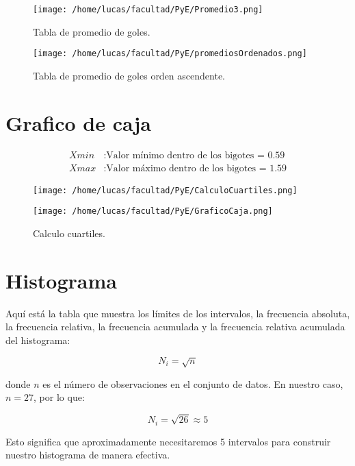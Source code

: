 \begin{figure}[h]
  \begin{center}
    \texttt{[image: /home/lucas/facultad/PyE/Promedio3.png]}
   \caption{Tabla de promedio de goles.}
  \end{center}
\end{figure}

\begin{figure}[h]
  \begin{center}
    \texttt{[image: /home/lucas/facultad/PyE/promediosOrdenados.png]}
   \caption{Tabla de promedio de goles orden ascendente.}
  \end{center}
\end{figure}

\clearpage
\section{Grafico de caja}
\begin{align*}
\text{$Xmin$} &: \text{Valor mínimo dentro de los bigotes = 0.59} \\
\text{$Xmax$} &: \text{Valor máximo dentro de los bigotes = 1.59}
\end{align*}

\begin{figure}[h]
    \centering
    \texttt{[image: /home/lucas/facultad/PyE/CalculoCuartiles.png]}
    \caption{Calculo cuartiles.}
    \texttt{[image: /home/lucas/facultad/PyE/GraficoCaja.png]}

\end{figure}

\section{Histograma}

Aquí está la tabla que muestra los límites de los intervalos, la frecuencia absoluta, la frecuencia relativa, la frecuencia acumulada y la frecuencia relativa acumulada del histograma:


\[
N_i = \sqrt{n}
\]

donde \(n\) es el número de observaciones en el conjunto de datos. En nuestro caso, \(n = 27\), por lo que:

\[
N_i = \sqrt{26} \approx 5
\]

Esto significa que aproximadamente necesitaremos 5 intervalos para construir nuestro histograma de manera efectiva.





